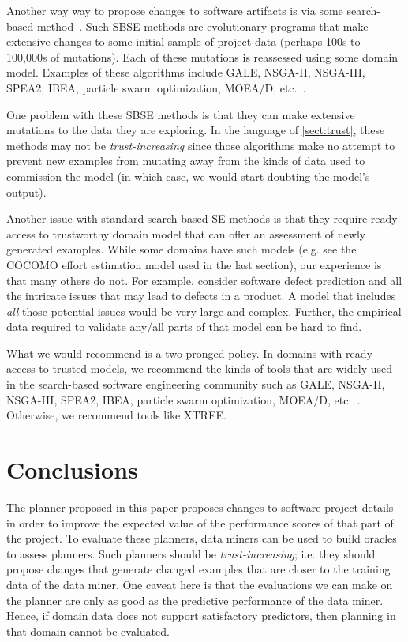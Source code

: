 \documentclass{sig-alternate}
\newcommand{\tion}[1]{\textsection\ref{sect:#1}}
\begin{document}
Another way way to propose changes to software artifacts
is   via some search-based method~\cite{Harman2009,Harman2011}. Such SBSE methods are   evolutionary programs that 
make
 extensive changes to  some initial sample of project data
 (perhaps 
100s to 100,000s of mutations). Each of these mutations
is reassessed using some domain model.
Examples of these algorithms include GALE, NSGA-II, NSGA-III, SPEA2, IBEA, particle swarm optimization, MOEA/D, etc.~\cite{krall14,deb00a,zit02,zit04,%
deb14,Cui2005a,zhang07:TEC}.

One problem with these   SBSE methods is that they can  make extensive mutations to the data they are exploring. In the language
of \tion{trust}, these methods may not be {\em trust-increasing} since those algorithms make no attempt
to prevent new examples from mutating away from the kinds of data used to commission the model (in which case, we would
start doubting the model's output).

Another issue with standard search-based SE methods is that they require ready access to 
trustworthy domain model that can offer an assessment
of newly generated examples. While some domains have such models (e.g. see the COCOMO effort estimation model
used in the last section), our experience is that many others do not.  For example, 
consider software defect prediction and all the intricate issues that may lead to defects in a product. A model that includes {\em all} those
potential issues would be very large and complex. Further,
the empirical data required to validate any/all parts
of that model can be hard to find.

What we would recommend is a two-pronged policy.
In domains with ready access to trusted models, we recommend
the kinds of tools that are widely used in the search-based
software engineering community such as GALE, NSGA-II, NSGA-III, SPEA2, IBEA, particle swarm optimization, MOEA/D, etc.~\cite{krall14,deb00a,zit02,zit04,%
deb14,Cui2005a,zhang07:TEC}. Otherwise, we recommend tools like XTREE.

\section{Conclusions}

The planner proposed in this paper proposes changes to software project details in order to improve the expected
value of the performance scores of that part of the project.
To evaluate these planners,
data miners can be used to build oracles to assess planners.
Such planners should be {\em trust-increasing}; i.e. they should propose changes that generate
changed examples that are closer to the training data of the data miner.
One caveat here is that the evaluations we can make on the planner are only as good as the predictive
performance of the data miner. Hence, if domain data does not support satisfactory predictors, then
planning in that domain cannot be evaluated.
\end{document}
